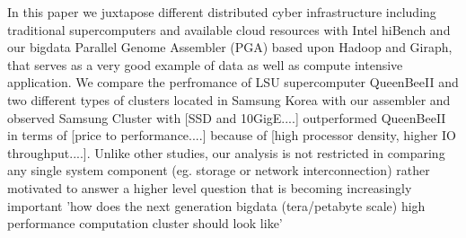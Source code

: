 In this paper we juxtapose different distributed cyber infrastructure including traditional supercomputers and available cloud resources with Intel hiBench and our bigdata Parallel Genome Assembler (PGA) based upon Hadoop and Giraph, that serves as a very good example of data as well as compute intensive application.
We compare the perfromance of LSU supercomputer QueenBeeII and two different types of clusters located in Samsung Korea with our assembler and observed Samsung Cluster with [SSD and 10GigE....] outperformed QueenBeeII in terms of [price to performance....] because of [high processor density, higher IO throughput....].
Unlike other studies, our analysis is not restricted in comparing any single system component (eg. storage or network interconnection) rather motivated to answer a higher level question that is becoming increasingly important 'how does the next generation bigdata (tera/petabyte scale) high performance computation cluster should look like'

